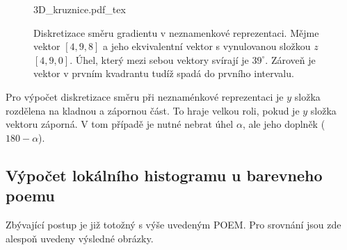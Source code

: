 \documentclass{report}
\begin{document}
\begin{figure}[H]
    \centering    
    \def\svgwidth{\columnwidth}
	{3D_kruznice.pdf_tex}    
    \caption{Diskretizace směru gradientu v neznamenkové reprezentaci. Mějme vektor $[4, 9, 8]$ a jeho ekvivalentní vektor s vynulovanou složkou $z$ $[4,9, 0]$. Úhel, který mezi sebou vektory svírají je $39 ^\circ$. Zároveň je vektor v prvním kvadrantu tudíž spadá do prvního intervalu.}
    \label{fig: diskretizace3D}
\end{figure}

\par Pro výpočet diskretizace směru při neznaménkové reprezentaci je $y$ složka rozdělena na kladnou a zápornou část. To hraje velkou roli, pokud je $y$ složka vektoru záporná. V tom případě je nutné nebrat úhel $\alpha$, ale jeho doplněk ($ 180 - \alpha$).

\subsection{Výpočet lokálního histogramu u barevneho poemu}
Zbývající postup je již totožný s výše uvedeným POEM. Pro srovnání jsou zde alespoň uvedeny výsledné obrázky. 
\end{document}
